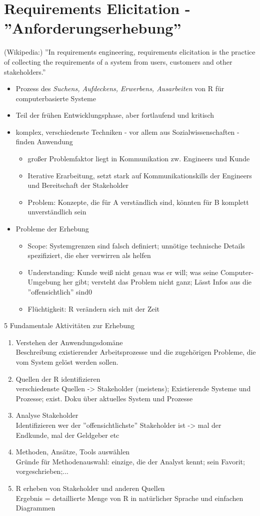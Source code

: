 \section{Requirements Elicitation - ''Anforderungserhebung''}
(Wikipedia:) ''In requirements engineering, requirements elicitation is the practice of collecting the requirements of a system from users, customers and other stakeholders.''
\begin{itemize}
	\item Prozess des \textit{Suchens, Aufdeckens, Erwerbens, Ausarbeiten} von R für computerbasierte Systeme
	\item Teil der frühen Entwicklungsphase, aber fortlaufend und kritisch
	\item komplex, verschiedenste Techniken - vor allem aus Sozialwissenschaften - finden Anwendung
	\begin{itemize}
		\item großer Problemfaktor liegt in Kommunikation zw. Engineers und Kunde
		\item Iterative Erarbeitung, setzt stark auf Kommunikationskills der Engineers und Bereitschaft der Stakeholder
		\item Problem: Konzepte, die für A verständlich sind, könnten für B komplett unverständlich sein
	\end{itemize}
	\item Probleme der Erhebung
	\begin{itemize}
		\item Scope: Systemgrenzen sind falsch definiert; unnötige technische Details spezifiziert, die eher verwirren als helfen
		\item Understanding: Kunde weiß nicht genau was er will; was seine Computer-Umgebung her gibt; versteht das Problem nicht ganz; Lässt Infos aus die ''offensichtlich'' sind0
		\item Flüchtigkeit: R verändern sich mit der Zeit
	\end{itemize}
\end{itemize}
5 Fundamentale Aktivitäten zur Erhebung
\begin{enumerate}
	\item Verstehen der Anwendungsdomäne\\
	Beschreibung existierender Arbeitsprozesse und die zugehörigen Probleme, die vom System gelöst werden sollen.
	\item Quellen der R identifizieren\\
	verschiedenste Quellen -> Stakeholder (meistens); Existierende Systeme und Prozesse; exist. Doku über aktuelles System und Prozesse
	\item Analyse Stakeholder\\
	Identifizieren wer der ''offensichtlichste'' Stakeholder ist -> mal der Endkunde, mal der Geldgeber etc
	\item Methoden, Ansätze, Tools auswählen\\
	Gründe für Methodenauswahl: einzige, die der Analyst kennt; sein Favorit; vorgeschrieben;...
	\item R erheben von Stakeholder und anderen Quellen\\
	Ergebnis = detaillierte Menge von R in natürlicher Sprache und einfachen Diagrammen
\end{enumerate}
